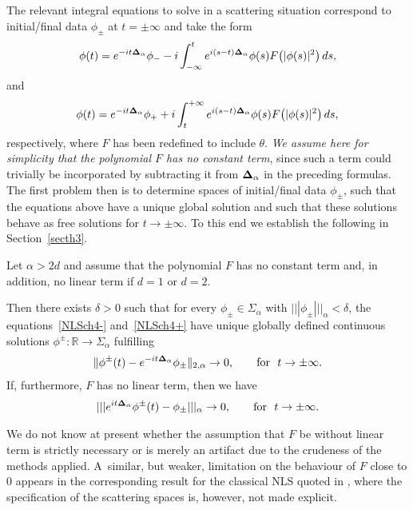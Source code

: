 \documentclass[pdftex]{sigma}
\begin{document}
The relevant integral equations to solve in a scattering situation
correspond to initial/f\/inal data $\phi_\pm$ at $t=\pm\infty$ and
take the form
\begin{gather}
\label{NLSch4-}
\phi(t)=e^{-it{{\bf\Delta}_\alpha}}\phi_--i\int_{-\infty}^t
e^{i{(s-t){\bf\Delta}_\alpha}}\phi(s) F\big(|\phi(s)|^2\big)\,ds ,
\end{gather}
and
\begin{gather}
\label{NLSch4+}
\phi(t)=e^{-it{{\bf\Delta}_\alpha}}\phi_++i\int^{+\infty}_t
e^{i{(s-t){\bf\Delta}_\alpha}}\phi(s) F\big(|\phi(s)|^2\big)\,ds ,
\end{gather}
respectively, where $F$ has been redef\/ined to include $\theta$.
 {\it We assume here for simplicity that the polynomial $F$
has no constant term}, since such a term could trivially be incorporated by
subtracting it from ${\bf\Delta}_\alpha$ in the preceding formulas.   The
f\/irst problem
then is to determine spaces of initial/f\/inal data $\phi_\pm$, such that the
equations above have a unique global solution and such that these
solutions behave as free solutions for $t\to \pm\infty$.
To this end we establish the following in Section~\ref{secth3}.

\begin{theorem}\label{th3}
Let $\alpha>2d$ and assume that the polynomial $F$ has no constant
term and, in addition, no linear term
if $d=1$ or $d=2$.

Then there exists $\delta>0$ such that for every
 $\phi_\pm\in\Sigma_{\alpha}$ with $|||\phi_\pm|||_{\alpha}<\delta$, the
equations~\eqref{NLSch4-} and~\eqref{NLSch4+} have unique globally
defined continuous solutions $\phi^\pm:\mathbb R\to \Sigma_{\alpha}$ fulfilling
\begin{gather}\label{solsmall1}
\Vert\phi^\pm(t)- e^{-it{{\bf\Delta}_\alpha}}\phi_\pm\Vert_{2,\alpha}  \to
0,\qquad\mbox{for}\ \ t\to\pm\infty .
\end{gather}
If, furthermore, $F$ has no linear term, then we have
\begin{gather}\label{solsmall2}
 |||e^{it{{\bf\Delta}_\alpha}}\phi^\pm(t)- \phi_\pm |||_{\alpha}  \to
0,\qquad\mbox{for}\  \ t\to\pm\infty .
\end{gather}
\end{theorem}


\begin{remark} We do not know at present whether the assumption that $F$
be without linear term is strictly necessary or is merely an artifact
due to the crudeness of the methods applied. A~similar, but weaker,
limitation on the behaviour of $F$ close to $0$
appears in the corresponding result for the classical NLS quoted in
\cite[Teorem 6.6]{Strauss}, where the specif\/ication of the scattering
spaces is, however, not made explicit.
\end{remark}
\end{document}
